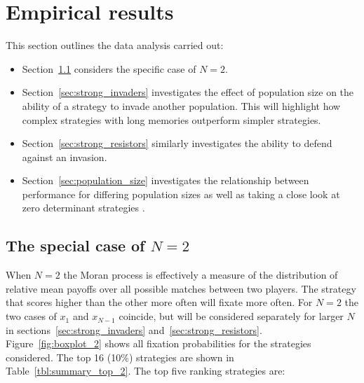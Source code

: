 \documentclass{article}
\begin{document}
\section{Empirical results}\label{sec:empirical_results}

This section outlines the data analysis carried out:

\begin{itemize}
    \item Section~\ref{sec:two_individuals} considers the specific case of
        \(N=2\).
    \item Section~\ref{sec:strong_invaders} investigates the effect of
        population size on the ability of a strategy to invade another
        population. This will highlight how complex strategies with long
        memories outperform simpler strategies.
    \item Section~\ref{sec:strong_resistors} similarly investigates the
        ability to defend against an invasion.
    \item Section~\ref{sec:population_size} investigates the relationship
        between performance for differing population sizes as well as
        taking a close look at zero determinant strategies \cite{Press2012}.
\end{itemize}

\subsection{The special case of \(N=2\)}\label{sec:two_individuals}

When $N=2$ the Moran process is effectively a measure of the distribution of relative
mean payoffs over all possible matches between two players. The strategy
that scores higher than the other more often will fixate more often. For \(N=2\)
the two cases of \(x_1\) and \(x_{N-1}\) coincide, but will be
considered separately for larger \(N\) in sections~\ref{sec:strong_invaders}
and~\ref{sec:strong_resistors}. Figure~\ref{fig:boxplot_2} shows all fixation
probabilities for the strategies considered. The top 16 (10\%) strategies are
shown in
Table~\ref{tbl:summary_top_2}. The top five ranking strategies are:
\end{document}
